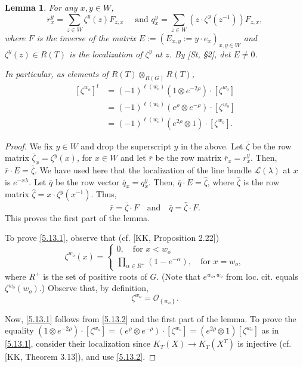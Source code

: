 \documentclass{article}
\newtheorem{lemma}[theorem]{Lemma}
\def\L{\mathcal{L}}
\begin{document}
\begin{lemma}\label{5.13}
For any $x,y \in W$, 
$$
r_x^y = \sum_{z \in W} \zeta^y  (z) F_{z,x}\quad\mbox{ and } q^y_x = \sum_{z\in W} \left(z \cdot \zeta^y (z^{-1})\right) F_{z,x},
$$
where $F$ is the inverse of the matrix 
$E:= \left(E_{x,y} := y\cdot e_x\right)_{x,y \in W}$ and $\zeta^y(z)\in R(T)$ is the localization of $\zeta^y$ at $z$. By [St, \S2], det $E\neq 0$. 

In particular, as elements of $R(T)\otimes_{R(G)}R(T)$,
\begin{align}\label{5.13.1}
\left[ \zeta^{w_o}\right] ^t &= (-1) ^{\ell(w_o)} \left(1\otimes e^{-2\rho}\right) \cdot \left[ \zeta^{w_o}\right]\nonumber\\
&= (-1)^{\ell(w_o)} \left( e^\rho \otimes e^{-\rho} \right) \cdot \left[ \zeta^{w_o}\right]\nonumber\\
&= (-1)^{\ell(w_o)} \left( e^{2\rho} \otimes 1 \right) \cdot \left[ \zeta^{w_o}\right].
\end{align}
\end{lemma}

\begin{proof}
We fix $y\in W$ and drop the superscript $y$ in the above. Let $\bar{\zeta}$ be the row matrix $\bar{\zeta}_x= {\zeta}^y (x)$, for $x\in W$ and let $\bar{r}$ be the row matrix $\bar{r}_x= r_x^y$. Then, $\bar{r}\cdot E=\bar{\zeta}$. We have used here that the localization of the line bundle $\L(\lambda)$ at $x$ is $e^{-x\lambda}$. 
Let $\bar{q}$ be the row vector $\bar{q}_x=q_x^y$. 
Then, $\bar{q} \cdot E=\hat{\zeta}$, where $\hat{\zeta}$ is the row matrix
$\hat{\zeta}=x\cdot {\zeta}^y (x^{-1})$. Thus, 
$$
\bar{r}=\bar{\zeta}\cdot F \quad \mbox{and}\quad \bar{q} =\hat{\zeta}\cdot F.
$$
This proves the first part of the lemma. 

To prove \eqref{5.13.1}, observe that (cf. [KK, Proposition 2.22])
\begin{equation}\label{5.13.2}
\zeta^{w_o} (x) =
\left\{
\begin{array}{l}
\displaystyle 0, \quad \mbox{for } x<w_o\\
\displaystyle \prod_{\alpha\in R^+ }\left(1-e^{-\alpha}\right),\quad \mbox{for } x=w_o,
\end{array}
\right.
\end{equation}
where $R^+$ is the set of positive roots of $G$. (Note that $e^{w_o,w_o}$ from loc. cit. equals $\overline{\zeta^{w_o}(w_o)}$.) Observe that, by definition, 
\begin{equation}\label{5.13.3}
\zeta^{w_o} =\mathcal{O}_{\left\{w_o \right\}}.
\end{equation}

Now, \eqref{5.13.1} follows from \eqref{5.13.2} and the first part of the lemma. To prove the equality $\left(1\otimes e^{-2\rho}\right)\cdot \left[\zeta^{w_o}\right]=\left(e^\rho \otimes e^{-\rho}\right)\cdot \left[\zeta^{w_o}\right]=\left(e^{2\rho}\otimes 1\right) \left[\zeta^{w_o}\right]$ as in \eqref{5.13.1}, consider their localization since $K_T(X)\rightarrow K_T(X^T)$ is injective (cf. [KK, Theorem 3.13]), and use \eqref{5.13.2}. 
\end{proof}
\end{document}
